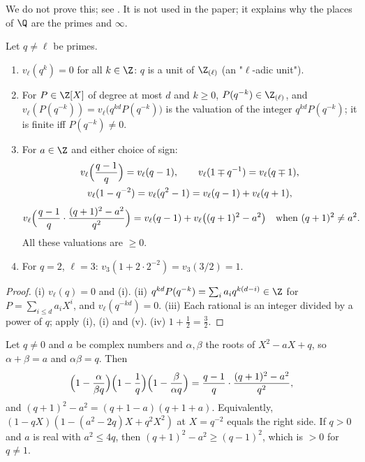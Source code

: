 We do not prove this; see \cite[Chapter II, Section 3]{Neukirch}. It is not used in the paper; it explains why the places of $\Q$ are
the primes and $\infty$.

\begin{lemma}\label{lem:rings:ell-integral}
Let $q\ne\ell$ be primes.
\begin{enumerate}[label=(\roman*)]
\item $v_\ell(q^k)=0$ for all $k\in\Z$: $q$ is a unit of $\Z_{(\ell)}$ (an "$\ell$-adic unit").
\item For $P\in\Z[X]$ of degree at most $d$ and $k\ge0$, $P(q^{-k})\in\Z_{(\ell)}$, and $v_\ell(P(q^{-k}))=v_\ell\bigl(q^{kd}P(q^{-k})\bigr)$ is the valuation of the integer
$q^{kd}P(q^{-k})$; it is finite iff $P(q^{-k})\ne0$.
\item For $a\in\Z$ and either choice of sign:
\begin{gather*}
v_\ell\Bigl(\frac{q-1}q\Bigr)=v_\ell(q-1),\qquad v_\ell(1\mp q^{-1})=v_\ell(q\mp1),\\
v_\ell(1-q^{-2})=v_\ell(q^2-1)=v_\ell(q-1)+v_\ell(q+1),
\end{gather*}
\[
v_\ell\Bigl(\frac{q-1}q\cdot\frac{(q+1)^2-a^2}{q^2}\Bigr)=v_\ell(q-1)+v_\ell\bigl((q+1)^2-a^2\bigr)\quad\text{when }(q+1)^2\ne a^2.
\]
All these valuations are $\ge0$.
\item For $q=2$, $\ell=3$: $v_3(1+2\cdot2^{-2})=v_3(3/2)=1$.
\end{enumerate}
\end{lemma}

\begin{proof}
(i) $v_\ell(q)=0$ and (i). (ii) $q^{kd}P(q^{-k})=\sum_ia_iq^{k(d-i)}\in\Z$ for $P=\sum_{i\le d}a_iX^i$, and $v_\ell(q^{-kd})=0$. (iii) Each rational
is an integer divided by a power of $q$; apply (i), (i) and (v). (iv) $1+\frac12=\frac32$.
\end{proof}

\begin{proposition}\label{prop:rings:i0star-identity}
Let $q\ne0$ and $a$ be complex numbers and $\alpha,\beta$ the roots of $X^2-aX+q$, so $\alpha+\beta=a$ and $\alpha\beta=q$. Then
\[
\Bigl(1-\frac\alpha{\beta q}\Bigr)\Bigl(1-\frac1q\Bigr)\Bigl(1-\frac\beta{\alpha q}\Bigr)=\frac{q-1}q\cdot\frac{(q+1)^2-a^2}{q^2},
\]
and $(q+1)^2-a^2=(q+1-a)(q+1+a)$. Equivalently, $(1-qX)(1-(a^2-2q)X+q^2X^2)$ at $X=q^{-2}$ equals the right side. If $q>0$ and $a$ is real with $a^2\le4q$, then
$(q+1)^2-a^2\ge(q-1)^2$, which is $>0$ for $q\ne1$.
\end{proposition}

